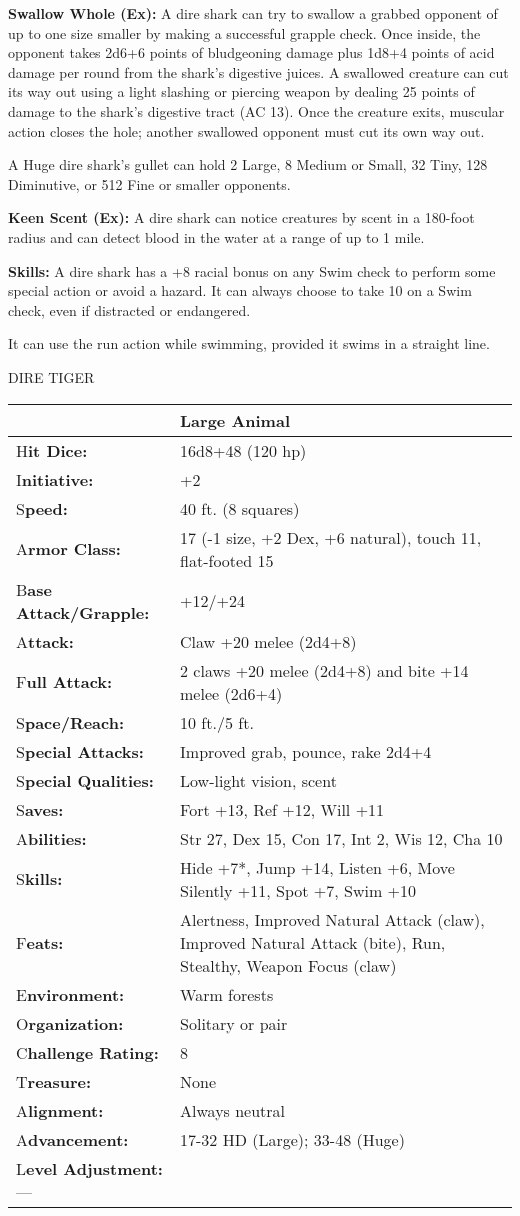 \documentclass{article}
\begin{document}
\textbf{Swallow Whole (Ex):} A dire shark can try to swallow a grabbed opponent 
of up to one size smaller by making a successful grapple check. Once inside, the 
opponent takes 2d6+6 points of bludgeoning damage plus 1d8+4 points of acid damage 
per round from the shark's digestive juices. A swallowed creature can cut its way 
out using a light slashing or piercing weapon by dealing 25 points of damage to 
the shark's digestive tract (AC 13). Once the creature exits, muscular action closes 
the hole; another swallowed opponent must cut its own way out.

A Huge dire shark's gullet can hold 2 Large, 8 Medium or Small, 32 Tiny, 128 Diminutive, 
or 512 Fine or smaller opponents.

\textbf{Keen Scent (Ex):} A dire shark can notice creatures by scent in a 180-foot 
radius and can detect blood in the water at a range of up to 1 mile.

\textbf{Skills:} A dire shark has a +8 racial bonus on any Swim check to perform 
some special action or avoid a hazard. It can always choose to take 10 on a Swim 
check, even if distracted or endangered.

It can use the run action while swimming, provided it swims in a straight line.

\vspace{12pt}
DIRE TIGER

\begin{tabular}{|>{\raggedright}p{91pt}|>{\raggedright}p{231pt}|}
\hline
  & Large Animal\tabularnewline
\hline
H\textbf{it Dice:} & 16d8+48 (120 hp)\tabularnewline
\hline
I\textbf{nitiative:} & +2\tabularnewline
\hline
S\textbf{peed:} & 40 ft. (8 squares)\tabularnewline
\hline
A\textbf{rmor Class:} & 17 (-1 size, +2 Dex, +6 natural), touch 11, flat-footed 
15\tabularnewline
\hline
B\textbf{ase Attack/Grapple:} & +12/+24\tabularnewline
\hline
A\textbf{ttack:} & Claw +20 melee (2d4+8)\tabularnewline
\hline
F\textbf{ull Attack:} & 2 claws +20 melee (2d4+8) and bite +14 melee (2d6+4)\tabularnewline
\hline
S\textbf{pace/Reach:} & 10 ft./5 ft.\tabularnewline
\hline
S\textbf{pecial Attacks:} & Improved grab, pounce, rake 2d4+4\tabularnewline
\hline
S\textbf{pecial Qualities:} & Low-light vision, scent\tabularnewline
\hline
S\textbf{aves:} & Fort +13, Ref +12, Will +11\tabularnewline
\hline
A\textbf{bilities:} & Str 27, Dex 15, Con 17, Int 2, Wis 12, Cha 10\tabularnewline
\hline
S\textbf{kills:} & Hide +7*, Jump +14, Listen +6, Move Silently +11, Spot +7, Swim 
+10\tabularnewline
\hline
F\textbf{eats:} & Alertness, Improved Natural Attack (claw), Improved Natural Attack 
(bite), Run, Stealthy, Weapon Focus (claw)\tabularnewline
\hline
E\textbf{nvironment:} & Warm forests\tabularnewline
\hline
O\textbf{rganization:} & Solitary or pair\tabularnewline
\hline
C\textbf{hallenge Rating:} & 8\tabularnewline
\hline
T\textbf{reasure:} & None\tabularnewline
\hline
A\textbf{lignment:} & Always neutral\tabularnewline
\hline
A\textbf{dvancement:} & 17-32 HD (Large); 33-48 (Huge)\tabularnewline
\hline
L\textbf{evel Adjustment:}--- & \tabularnewline
\hline
\end{tabular}
\end{document}
